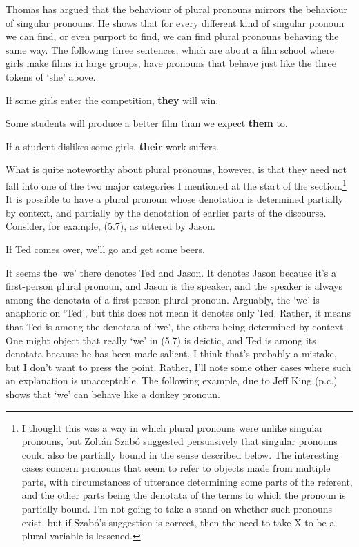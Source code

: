 Thomas \cite[Ch. 9]{McKay2006} has argued that the behaviour of plural pronouns mirrors the behaviour of singular pronouns. He shows that for every different kind of singular pronoun we can find, or even purport to find, we can find plural pronouns behaving the same way. The following three sentences, which are about a film school where girls make films in large groups, have pronouns that behave just like the three tokens of `she' above.

\renewcommand{\labelenumi}{(5.\arabic{enumi})}
\begin{enumerate*}
\setcounter{enumi}{3}
\item If some girls enter the competition, \textbf{they} will win.

\item Some students will produce a better film than we expect \textbf{them} to.

\item If a student dislikes some girls, \textbf{their} work suffers.
\end{enumerate*}

\noindent What is quite noteworthy about plural pronouns, however, is that they need not fall into one of the two major categories I mentioned at the start of the section.\footnote{ I thought this was a way in which plural pronouns were unlike singular pronouns, but Zolt\'{a}n Szab\'{o} suggested persuasively that singular pronouns could also be partially bound in the sense described below. The interesting cases concern pronouns that seem to refer to objects made from multiple parts, with circumstances of utterance determining some parts of the referent, and the other parts being the denotata of the terms to which the pronoun is partially bound. I'm not going to take a stand on whether such pronouns exist, but if Szab\'{o}'s suggestion is correct, then the need to take X to be a plural variable is lessened.} It is possible to have a plural pronoun whose denotation is determined partially by context, and partially by the denotation of earlier parts of the discourse. Consider, for example, (5.7), as uttered by Jason.

\renewcommand{\labelenumi}{(5.\arabic{enumi})}
\begin{enumerate*}
\setcounter{enumi}{6}
\item If Ted comes over, we'll go and get some beers.
\end{enumerate*}

\noindent It seems the `we' there denotes Ted and Jason. It denotes Jason because it's a first-person plural pronoun, and Jason is the speaker, and the speaker is always among the denotata of a first-person plural pronoun. Arguably, the `we' is anaphoric on `Ted', but this does not mean it denotes only Ted. Rather, it means that Ted is among the denotata of `we', the others being determined by context. One might object that really `we' in (5.7) is deictic, and Ted is among its denotata because he has been made salient. I think that's probably a mistake, but I don't want to press the point. Rather, I'll note some other cases where such an explanation is unacceptable. The following example, due to Jeff King (p.c.) shows that `we' can behave like a donkey pronoun.

